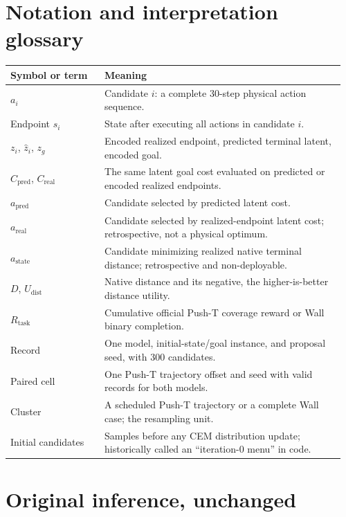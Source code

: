 \appendix
\section{Notation and interpretation glossary}
\label{app:glossary}

\begin{table}[h]
\centering
\begin{tabular}{@{}p{0.27\linewidth}p{0.69\linewidth}@{}}
\toprule
Symbol or term & Meaning\\
\midrule
$a_i$ & Candidate $i$: a complete 30-step physical action sequence.\\
Endpoint $s_i$ & State after executing all actions in candidate $i$.\\
$z_i$, $\hat z_i$, $z_g$ & Encoded realized endpoint, predicted terminal latent, encoded goal.\\
$C_{\mathrm{pred}}$, $C_{\mathrm{real}}$ & The same latent goal cost evaluated on predicted or encoded realized endpoints.\\
$a_{\mathrm{pred}}$ & Candidate selected by predicted latent cost.\\
$a_{\mathrm{real}}$ & Candidate selected by realized-endpoint latent cost; retrospective, not a physical optimum.\\
$a_{\mathrm{state}}$ & Candidate minimizing realized native terminal distance; retrospective and non-deployable.\\
$D$, $U_{\mathrm{dist}}$ & Native distance and its negative, the higher-is-better distance utility.\\
$R_{\mathrm{task}}$ & Cumulative official Push-T coverage reward or Wall binary completion.\\
Record & One model, initial-state/goal instance, and proposal seed, with 300 candidates.\\
Paired cell & One Push-T trajectory offset and seed with valid records for both models.\\
Cluster & A scheduled Push-T trajectory or a complete Wall case; the resampling unit.\\
Initial candidates & Samples before any CEM distribution update; historically called an ``iteration-0 menu'' in code.\\
\bottomrule
\end{tabular}
\end{table}

\section{Original inference, unchanged}
\label{app:original}


